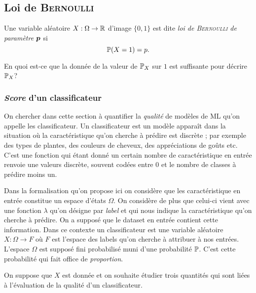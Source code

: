 \documentclass[11pt, a4paper]{article}
\begin{document}
\subsection{Loi de \textsc{Bernoulli}}
\label{sec:loibernoulli}

Une variable aléatoire $X : \Omega \to \mathbb{R}$ d'image
$\{0 , 1\}$ est dite \emph{loi de \textsc{Bernoulli} de paramètre
  $\boldsymbol{p}$} si
\[
  \operatorname{\mathbb{P}}(X = 1) = p.
\]
\begin{question}
  En quoi est-ce que la donnée de la valeur de $\operatorname{\mathbb{P}}_X$ sur $1$ est
  suffisante pour décrire $\operatorname{\mathbb{P}}_X$?
\end{question}

\subsubsection{\emph{Score} d'un classificateur}
\label{sec:classificateurAlea}

On chercher dans cette section à quantifier la \textit{qualité} de
modèles de ML qu'on appelle les classificateur. Un classificateur est
un modèle apparaît dans la situation où la caractéristique qu'on
cherche à prédire est discrète ; par exemple des types de plantes, des
couleurs de cheveux, des appréciations de goûts etc. C'est une
fonction qui étant donné un certain nombre de caractéristique en
entrée renvoie une valeurs discrète, souvent codées entre $0$ et le
nombre de classes à prédire moins un.

Dans la formalisation qu'on propose ici on considère que les
caractéristique en entrée constitue un espace d'états $\Omega$. On
considère de plus que celui-ci vient avec une fonction $\lambda$ qu'on
désigne par \textit{label} et qui nous indique la caractéristique
qu'on cherche à prédire. On a supposé que le dataset en entrée
contient cette information. Dans ce contexte un classificateur est une
variable aléatoire $X : \Omega \to F$ où $F$ est l'espace des labels
qu'on cherche à attribuer à nos entrées. L'espace $\Omega$ est supposé
fini probabilisé muni d'une probabilité $\mathbb{P}$. C'est cette
probabilité qui fait office de \textit{proportion}.

On suppose que $X$ est donnée et on souhaite étudier trois quantités
qui sont liées à l'évaluation de la qualité d'un classificateur.
\end{document}
